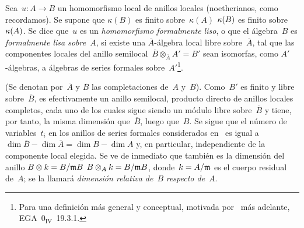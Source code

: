 \begin{definition}
\label{III.1.1}
Sea~$u\colon A\to B$ un homomorfismo local de anillos locales (noetherianos, como recordamos). Se supone que
{$\kappa(B)$ es finito sobre~$\kappa(A)$}
{$\kappa(B)$ es finito sobre~$\kappa(A)$}.
Se dice que~$u$ es un \emph{homomorfismo formalmente liso},
%
%
o que el álgebra~$B$ es \emph{formalmente lisa sobre}~$A$, si existe una $\overline{A}$-álgebra local
libre sobre~$\overline{A}$, tal que las componentes locales del anillo semilocal~$\overline{B}\otimes_{\overline{A}}A'=B'$ sean isomorfas, como $A'$-álgebras, a álgebras de series formales sobre~$A'$\kern1pt\footnote{Para una definición más general y conceptual, motivada por~ más adelante, \cf EGA~$\mathrm{0}_{\mathrm{IV}}$~19.3.1.}.
\end{definition}
(Se denotan por~$\overline{A}$ y $\overline{B}$ las completaciones de~$A$ y~$B$). Como~$B'$ es finito y libre sobre~$\overline{B}$, es efectivamente un anillo semilocal, producto directo de anillos locales completos, cada uno de los cuales sigue siendo un módulo libre sobre~$\overline{B}$ y tiene, por tanto, la misma dimensión que~$\overline{B}$, luego que~$B$. Se sigue que el número de variables~$t_i$ en los anillos de series formales considerados en~ es igual a $\dim\overline{B}-\dim\overline{A}=\dim B-\dim A$ y, en particular, independiente de la componente local
elegida. Se ve de inmediato que también es la dimensión del anillo
{$B\otimes k=B/\mathfrak{m}B$}
{$B\otimes_A k=B/\mathfrak{m}B$},
donde~$k=A/\mathfrak{m}$ es el cuerpo residual de~$A$; se la llamará \emph{dimensión relativa de}~$B$
%
\emph{respecto de}~$A$.

